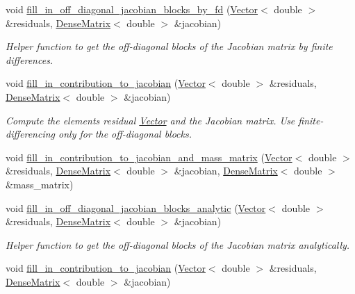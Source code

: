 \begin{DoxyCompactItemize}
\item 
void \hyperlink{classoomph_1_1BuoyantQCrouzeixRaviartElement_a5c64aaf8e6cefc31d89c62c28fc6f19b}{fill\+\_\+in\+\_\+off\+\_\+diagonal\+\_\+jacobian\+\_\+blocks\+\_\+by\+\_\+fd} (\hyperlink{classoomph_1_1Vector}{Vector}$<$ double $>$ \&residuals, \hyperlink{classoomph_1_1DenseMatrix}{Dense\+Matrix}$<$ double $>$ \&jacobian)
\begin{DoxyCompactList}\small\item\em Helper function to get the off-\/diagonal blocks of the Jacobian matrix by finite differences. \end{DoxyCompactList}\item 
void \hyperlink{classoomph_1_1BuoyantQCrouzeixRaviartElement_a7bd9313dd697c1219cee4a65692388b5}{fill\+\_\+in\+\_\+contribution\+\_\+to\+\_\+jacobian} (\hyperlink{classoomph_1_1Vector}{Vector}$<$ double $>$ \&residuals, \hyperlink{classoomph_1_1DenseMatrix}{Dense\+Matrix}$<$ double $>$ \&jacobian)
\begin{DoxyCompactList}\small\item\em Compute the element\textquotesingle{}s residual \hyperlink{classoomph_1_1Vector}{Vector} and the Jacobian matrix. Use finite-\/differencing only for the off-\/diagonal blocks. \end{DoxyCompactList}\item 
void \hyperlink{classoomph_1_1BuoyantQCrouzeixRaviartElement_a7d22156d87949e4c64d597d60fe00225}{fill\+\_\+in\+\_\+contribution\+\_\+to\+\_\+jacobian\+\_\+and\+\_\+mass\+\_\+matrix} (\hyperlink{classoomph_1_1Vector}{Vector}$<$ double $>$ \&residuals, \hyperlink{classoomph_1_1DenseMatrix}{Dense\+Matrix}$<$ double $>$ \&jacobian, \hyperlink{classoomph_1_1DenseMatrix}{Dense\+Matrix}$<$ double $>$ \&mass\+\_\+matrix)
\item 
void \hyperlink{classoomph_1_1BuoyantQCrouzeixRaviartElement_aa344d9c1a36501baefc4afd56f227b94}{fill\+\_\+in\+\_\+off\+\_\+diagonal\+\_\+jacobian\+\_\+blocks\+\_\+analytic} (\hyperlink{classoomph_1_1Vector}{Vector}$<$ double $>$ \&residuals, \hyperlink{classoomph_1_1DenseMatrix}{Dense\+Matrix}$<$ double $>$ \&jacobian)
\begin{DoxyCompactList}\small\item\em Helper function to get the off-\/diagonal blocks of the Jacobian matrix analytically. \end{DoxyCompactList}\item 
void \hyperlink{classoomph_1_1BuoyantQCrouzeixRaviartElement_a7bd9313dd697c1219cee4a65692388b5}{fill\+\_\+in\+\_\+contribution\+\_\+to\+\_\+jacobian} (\hyperlink{classoomph_1_1Vector}{Vector}$<$ double $>$ \&residuals, \hyperlink{classoomph_1_1DenseMatrix}{Dense\+Matrix}$<$ double $>$ \&jacobian)

\end{DoxyCompactItemize}
